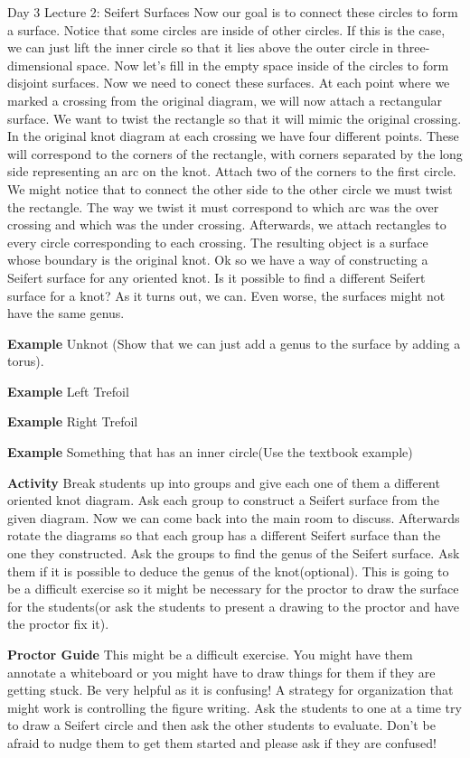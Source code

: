 \documentclass{article}
\begin{document}
\begin{section}{Day 3 Lecture 2: Seifert Surfaces}
Now our goal is to connect these circles to form a surface. Notice that some circles are inside of other circles. If this is the case, we can just lift the inner circle so that it lies above the outer circle in three-dimensional space. Now let's fill in the empty space inside of the circles to form disjoint surfaces. Now we need to conect these surfaces. At each point where we marked a crossing from the original diagram, we will now attach a rectangular surface. We want to twist the rectangle so that it will mimic the original crossing. In the original knot diagram at each crossing we have four different points. These will correspond to the corners of the rectangle, with corners separated by the long side representing an arc on the knot. Attach two of the corners to the first circle. We might notice that to connect the other side to the other circle we must twist the rectangle. The way we twist it must correspond to which arc was the over crossing and which was the under crossing. Afterwards, we attach rectangles to every circle corresponding to each crossing. The resulting object is a surface whose boundary is the original knot. Ok so we have a way of constructing a Seifert surface for any oriented knot. Is it possible to find a different Seifert surface for a knot? As it turns out, we can. Even worse, the surfaces might not have the same genus. 

\textbf{Example} Unknot (Show that we can just add a genus to the surface by adding a torus).

\textbf{Example} Left Trefoil

\textbf{Example} Right Trefoil

\textbf{Example} Something that has an inner circle(Use the textbook example)



\textbf{Activity} Break students up into groups and give each one of them a different oriented knot diagram. Ask each group to construct a Seifert surface from the given diagram. Now we can come back into the main room to discuss. Afterwards rotate the diagrams so that each group has a different Seifert surface than the one they constructed. Ask the groups to find the genus of the Seifert surface. Ask them if it is possible to deduce the genus of the knot(optional). This is going to be a difficult exercise so it might be necessary for the proctor to draw the surface for the students(or ask the students to present a drawing to the proctor and have the proctor fix it).

\textbf{Proctor Guide} This might be a difficult exercise. You might have them annotate a whiteboard or you might have to draw things for them if they are getting stuck. Be very helpful as it is confusing! A strategy for organization that might work is controlling the figure writing. Ask the students to one at a time try to draw a Seifert circle and then ask the other students to evaluate. Don't be afraid to nudge them to get them started and please ask if they are confused!

\end{section}
\end{document}
